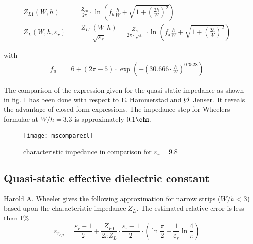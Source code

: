 \documentclass[10pt]{report}
\begin{document}
\begin{align}
\label{eq:HandJZL0}
Z_{L1}\left(W, h\right) &=
\frac{Z_{F0}}{2\pi}\cdot\ln{\left(f_{u}\frac{h}{W} + \sqrt{1 + \left(\frac{2h}{W}\right)^{2}}\right)}\\
\label{eq:HandJZL0Er}
Z_{L}\left(W, h, \varepsilon_{r}\right) &= \dfrac{Z_{L1} \left(W, h\right)}{\sqrt{\varepsilon_{r}}} = \frac{Z_{F0}}{2\pi\cdot\sqrt{\varepsilon_{r}}}\cdot\ln{\left(f_{u}\frac{h}{W} + \sqrt{1 + \left(\frac{2h}{W}\right)^{2}}\right)}
\end{align}

with
\begin{align}
f_{u} &= 6 + \left(2\pi - 6\right)\cdot\exp{\left(-\left(30.666\cdot\frac{h}{W}\right)^{0.7528}\right)}
\end{align}

The comparison of the expression given for the quasi-static impedance
as shown in fig. \ref{fig:mscomparezl} has been done with respect to
E. Hammerstad and {\O}. Jensen.  It reveals the advantage of closed-form
expressions.  The impedance step for Wheelers formulae at $W/h = 3.3$
is approximately $0.1\ohm$.

\begin{figure}[ht]
\begin{center}
\texttt{[image: mscomparezl]}
\end{center}
\caption{characteristic impedance in comparison for $\varepsilon_{r} = 9.8$}
\label{fig:mscomparezl}
\end{figure}
\FloatBarrier

\subsection{Quasi-static effective dielectric constant}

Harold A. Wheeler \cite{Wheeler} gives the following approximation for
narrow strips ($W/h < 3$) based upon the characteristic impedance
$Z_L$.  The estimated relative error is less than 1\%.
\begin{equation}
\varepsilon_{r_{eff}} = \frac{\varepsilon_{r} + 1}{2} + \frac{Z_{F0}}{2\pi Z_{L}}\cdot \frac{\varepsilon_{r} - 1}{2}\cdot \left(\ln{\frac{\pi}{2}} + \frac{1}{\varepsilon_{r}} \ln{\frac{4}{\pi}}\right)
\end{equation}
\end{document}
